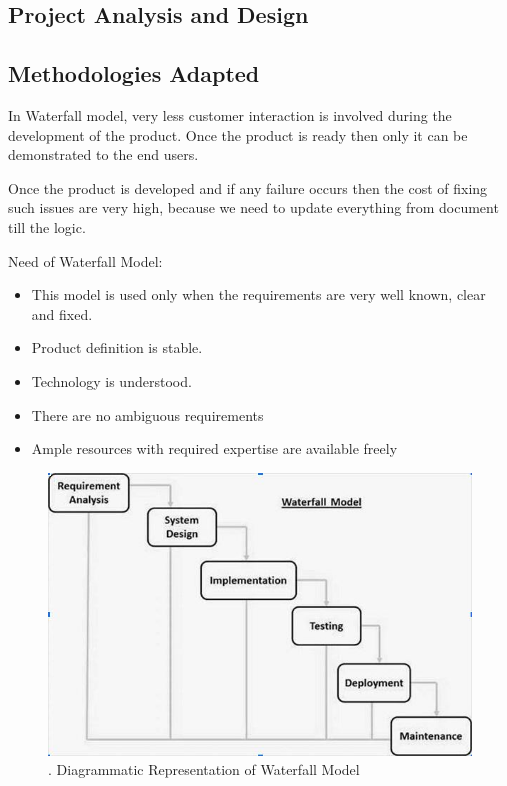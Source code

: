 \documentclass{article}
\begin{document}
\begin{flushleft}
    \section{Project Analysis and Design}
        \subsection{Methodologies Adapted}
            In Waterfall model, very less customer interaction is involved during the development of the product. Once the product is ready then only it can be demonstrated to the end users.
            \par
            Once the product is developed and if any failure occurs then the cost of fixing such issues are very high, because we need to update everything from document till the logic.
        
            Need of Waterfall Model:
            \begin{itemize}
                \item This model is used only when the requirements are very well known, clear and fixed.
                \item Product definition is stable.
                \item Technology is understood.
                \item There are no ambiguous requirements
                \item Ample resources with required expertise are available freely
                
            \end{itemize}
            \begin{figure}[!ht]
              
              \includegraphics[width=12cm]{WaterfallModel.JPG}
              \renewcommand{\thefigure}{ \thesubsection.\arabic{figure}}
              \caption{ .  Diagrammatic Representation of Waterfall Model}
            \end{figure}
            

\end{flushleft}
\end{document}
